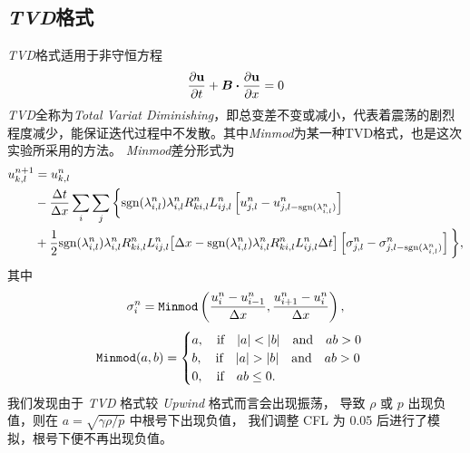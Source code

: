 \documentclass[10.5pt
]{article}
\begin{document}
\subsection{\textit{TVD}格式}
\textit{TVD}格式适用于非守恒方程
\begin{align}
\pdv{\vb u}{t} + \vb*B \vdot \pdv{\vb u}{x} = 0
\end{align}
\textit{TVD}全称为\textit{Total Variat Diminishing}，即总变差不变或减小，代表着震荡的剧烈程度减少，能保证迭代过程中不发散。其中\textit{Minmod}为某一种TVD格式，也是这次实验所采用的方法。
\textit{Minmod}差分形式为
\begin{equation}
\begin{aligned}
u_{k,l}^{n+1} &= u_{k,l}^n \\
& - \frac{\Delta t}{\Delta x} \sum_i \sum_j \bigg\{\text{sgn}(\lambda_{i,l}^n)
 \lambda_{i,l}^n R_{ki,l}^n L_{ij,l}^n \left[u_{j,l}^n - u_{j,l-\text{sgn}(\lambda_{i,l}^n)}^n\right]\\
& + \frac{1}{2}
\text{sgn}(\lambda_{i,l}^n) \lambda_{i,l}^n R_{ki,l}^n L_{ij,l}^n
	\qty[\Delta x-\text{sgn}(\lambda_{i,l}^n) \lambda_{i,l}^n R_{ki,l}^n L_{ij,l}^n \Delta t]
 \left[\sigma_{j,l}^n - \sigma_{j,l-\text{sgn}(\lambda_{i,l}^n)}^n\right]\bigg\},
\end{aligned}
\end{equation}
其中
\begin{equation}
	\sigma_i^n = \verb|Minmod| \left( \frac{u_i^n - u_{i-1}^{n}}{ \Delta x }, \frac{u_{i+1}^n - u_{i}^{n}}{ \Delta x } \right),
\end{equation}
\begin{equation}
	\verb|Minmod|(a, b) = 
	\begin{cases}
		a, \qif |a| < |b| \qand ab > 0\\
		b, \qif |a| > |b| \qand ab > 0\\
		0, \qif ab \leq 0.
	\end{cases}
\end{equation}
我们发现由于 \textit{TVD} 格式较 \textit{Upwind} 格式而言会出现振荡，
导致 \(\rho\) 或 \(p\) 出现负值，则在 \(a = \sqrt{\gamma \rho / p}\) 中根号下出现负值，
我们调整 CFL 为 0.05 后进行了模拟，根号下便不再出现负值。
\end{document}
